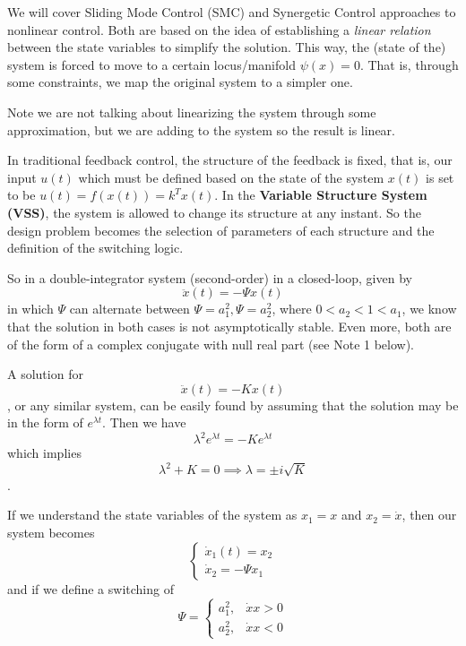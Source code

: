 
We will cover Sliding Mode Control (SMC) and Synergetic Control approaches to nonlinear control. Both are based on the idea of establishing a \emph{linear relation} between the state variables to simplify the solution. This way, the (state of the) system is forced to move to a certain locus/manifold $\psi(x)=0$. That is, through some constraints, we map the original system to a simpler one.

Note we are not talking about linearizing the system through some approximation, but we are adding to the system so the result is linear.

In traditional feedback control, the structure of the feedback is fixed, that is, our input $u(t)$ which must be defined based on the state of the system $x(t)$ is set to be $u(t)=f\left( x(t) \right) =k^{T}x(t)$. In the \textbf{Variable Structure System (VSS)}, the system is allowed to change its structure at any instant. So the design problem becomes the selection of parameters of each structure and the definition of the switching logic.

So in a double-integrator system (second-order) in a closed-loop, given by \[
    \ddot{x}(t)=-\Psi x(t)
\] in which $\Psi$ can alternate between $\Psi=a_1^{2},\Psi=a_2^{2}$, where $0<a_2<1<a_1$, we know that the solution in both cases is not asymptotically stable. Even more, both are of the form of a complex conjugate with null real part (see Note 1 below).

\begin{note}
    A solution for \[
    \ddot{x}(t) = -K x(t)
    \] , or any similar system, can be easily found by assuming that the solution may be in the form of $e^{\lambda t}$. Then we have \[
    \lambda^{2}e^{\lambda t} = -K e^{\lambda t}
    \] which implies \[
    \lambda^{2}+K = 0 \implies \lambda = \pm i\sqrt{K}
    \].
\end{note}

If we understand the state variables of the system as $x_1=x$ and $x_2=\dot{x}$, then our system becomes \[
\begin{cases}
    \dot{x}_1(t)=x_2 \\
    \dot{x}_2=-\Psi x_1
\end{cases}
\] and if we define a switching of \[
\Psi = \begin{cases}
    a_1^{2}, & \dot{x}x>0 \\
    a_2^{2}, & \dot{x}x < 0
\end{cases}
\] 

